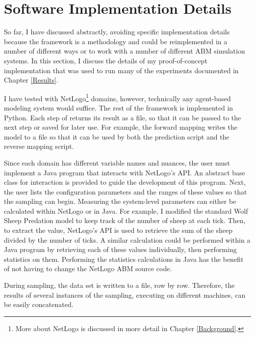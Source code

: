 \section{Software Implementation Details}
So far, I have discussed \fw abstractly, avoiding specific implementation details because the framework is a methodology and could be reimplemented in a number of different ways or to work with a number of different ABM simulation systems.
In this section, I discuss the details of my proof-of-concept implementation that was used to run many of the experiments documented in Chapter \ref{Results}.

I have tested \fw with NetLogo\footnote{More about NetLogo is discussed in more detail in Chapter \ref{Background}.} domains, however, technically any agent-based modeling system would suffice.
The rest of the framework is implemented in Python.
Each step of \fw returns its result as a file, so that it can be passed to the next step or saved for later use.
For example, the forward mapping writes the model to a file so that it can be used by both the prediction script and the reverse mapping script.

Since each domain has different variable names and nuances, the user must implement a Java program that interacts with NetLogo's API.
An abstract base class for interaction is provided to guide the development of this program.
Next, the user lists the configuration parameters and the ranges of these values so that the sampling can begin.
Measuring the system-level parameters can either be calculated within NetLogo or in Java.
For example, I modified the standard Wolf Sheep Predation model to keep track of the number of sheep at each tick.
Then, to extract the value, NetLogo's API is used to retrieve the sum of the sheep divided by the number of ticks.
A similar calculation could be performed within a Java program by retrieving each of these values individually, then performing statistics on them.
Performing the statistics calculations in Java has the benefit of not having to change the NetLogo ABM source code.


During sampling, the data set is written to a file, row by row.
Therefore, the results of several instances of the sampling, executing on different machines, can be easily concatenated.


